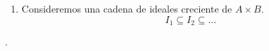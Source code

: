 \begin{isabellebody}
\begin{isamarkuptext}
\begin {solucion}
\begin{enumerate}
\item Consideremos una cadena de ideales creciente de $A \times B$. 
$$I_{1} \subseteq I_{2} \subseteq \ldots$$

\end {enumerate}

.
\end{solucion}%
\end{isamarkuptext}\isamarkuptrue%
%
\isadelimtheory
%
\endisadelimtheory
%
\isatagtheory
%
\endisatagtheory
{\isafoldtheory}%
%
\isadelimtheory
%
\endisadelimtheory
%
\end{isabellebody}%
\endinput
